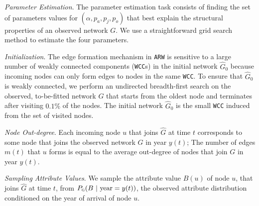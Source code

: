 \textit{Parameter Estimation}.
The parameter estimation task consists of finding the set of
parameters values for $(\alpha, p_a, p_j, p_o)$ that best explain the structural properties
of an observed network $G$. We use a straightforward grid search method to estimate
the four parameters.

\textit{Initialization}. The edge formation mechanism in \texttt{ARW} is
sensitive to a large number of weakly connected components (\texttt{WCC}s) in the
initial network $\hat{G}_0$ because incoming nodes can only form edges to nodes
in the same \texttt{WCC}. To ensure that $\hat{G}_0$ is weakly
connected, we perform an undirected breadth-first search on the observed,
to-be-fitted network $G$ that starts from the oldest node and terminates after
visiting $0.1\%$ of the nodes. The initial network $\hat{G}_0$ is the small \texttt{WCC}
induced from the set of visited nodes.


\textit{Node Out-degree}.
Each incoming node $u$ that joins $\hat{G}$ at time $t$ corresponds to some
node that joins the observed network $G$ in year $y(t)$; The number of edges $m(t)$
that $u$ forms is equal to the average out-degree of nodes that join $G$ in year $y(t)$.

\textit{Sampling Attribute Values}.
We sample the attribute value $B(u)$ of node $u$, that
joins $\hat{G}$ at time $t$, from $P_{\textsc{g}}(B{\mbox{ | year}=y(t)})$, the observed attribute distribution conditioned on the year of arrival of node $u$.

